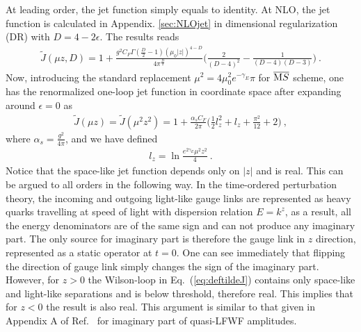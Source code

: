 \documentclass[a4paper,11pt]{article}
\begin{document}
At leading order, the jet function simply equals to identity. At NLO, the jet function is calculated in Appendix. \ref{sec:NLOjet} in dimensional regularization (DR) with $D=4-2\epsilon$. The results reads
\begin{align}
\tilde J(\mu z,D)=1+\frac{g^2 C_F\Gamma(\frac{D}{2}-1)(\mu_0 |z|)^{4-D}}{4\pi^{\frac{D}{2}}}\bigg(\frac{2}{(D-4)^2}-\frac{1}{(D-4)(D-3)}\bigg) \ .
\end{align}
Now, introducing the standard replacement $\mu^2 =4\mu_0^2 e^{-\gamma_E}\pi$ for $\overline{\text MS}$ scheme, one has the renormalized one-loop jet function in coordinate space after expanding around $\epsilon=0$ as
\begin{align}\label{jetoneloop}
\tilde J(\mu z)=\tilde J(\mu^2 z^2)=1+\frac{\alpha_s C_F}{2\pi} \bigg(\frac{1}{2}l_z^2+l_z+\frac{\pi^2}{12}+2\bigg) \ ,
\end{align}
where $\alpha_s=\frac{g^2}{4\pi}$, and we have defined 
\begin{align}\label{eq:deflz}
l_z=\ln \frac{e^{2\gamma_E}\mu^2z^2}{4} \ .
\end{align}
Notice that the space-like jet function depends only on $|z|$ and is real. This can be argued to all orders in the following way. In the time-ordered perturbation theory, the incoming and outgoing light-like gauge links are represented as heavy quarks travelling at speed of light with dispersion relation $E=k^z$, as a result, all the energy denominators are of the same sign and can not produce any imaginary part. The only source for imaginary part is therefore the gauge link in $z$ direction, represented as a static operator at $t=0$. One can see immediately that flipping the direction of gauge link simply changes the sign of the imaginary part. However, for $z>0$ the Wilson-loop in Eq.~(\ref{eq:deftildeJ}) contains only space-like and light-like separations and is below threshold, therefore real. This implies that for $z<0$ the result is also real. This argument is similar to that given in Appendix A of Ref.~\cite{Ji:2021znw} for imaginary part of quasi-LFWF amplitudes.
\end{document}
